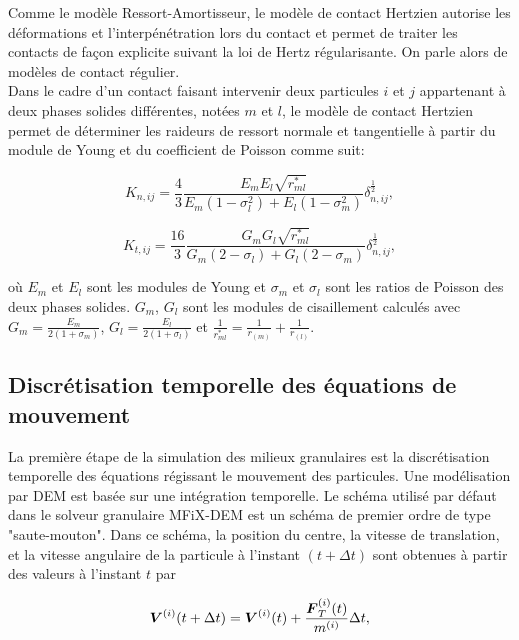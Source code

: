 Comme le modèle Ressort-Amortisseur, le modèle de contact Hertzien autorise les déformations et l'interpénétration lors du contact et permet de traiter les contacts de façon explicite suivant la loi de Hertz régularisante. On parle alors de modèles de contact régulier.\\
Dans le cadre d'un contact faisant intervenir deux particules $i$ et $j$ appartenant à deux phases solides différentes, notées $m$ et $l$, le modèle de contact Hertzien permet de déterminer les raideurs de ressort normale et tangentielle à partir du module de Young et du coefficient de Poisson comme suit:

\begin{equation} \label{eq: 20}
K_{n,ij} = \frac{4}{3} \frac{E_m E_l \sqrt{r^*_{ml}}}{E_m (1 - \sigma_l^2) + E_l (1 - \sigma_m^2)}\delta^{\frac{1}{2}}_{n,ij},
\end{equation}

\begin{equation} \label{eq: 21}
K_{t,ij} = \frac{16}{3} \frac{G_m G_l \sqrt{r^*_{ml}}}{G_m (2 - \sigma_l) + G_l (2 - \sigma_m)}\delta^{\frac{1}{2}}_{n,ij},
\end{equation}

où $E_m$ et $E_l$ sont les modules de Young et $\sigma_m$ et $\sigma_l$ sont les ratios de Poisson des deux phases solides. $G_m$, $G_l$ sont les modules de cisaillement calculés avec $G_m = \frac{E_m}{2(1 + \sigma_m)}$, $G_l = \frac{E_l}{2(1 + \sigma_l)}$ et $\frac{1}{r^*_{ml}} = \frac{1}{r_{(m)}} + \frac{1}{r_{(l)}}$.

\subsection{Discrétisation temporelle des équations de mouvement}

La première étape de la simulation des milieux granulaires est la discrétisation temporelle des équations régissant le mouvement des particules. Une modélisation par DEM est basée sur une intégration temporelle. Le schéma utilisé par défaut dans le solveur granulaire MFiX-DEM est un schéma de premier ordre de type "saute-mouton". Dans ce schéma, la position du centre, la vitesse de translation, et la vitesse angulaire de la particule à l'instant $(t + \Delta t)$ sont obtenues à partir des valeurs à l'instant $t$ par

\begin{equation} \label{eq: 22}
\boldsymbol{V}^{(i)}(t+\Delta t) = \boldsymbol{V}^{(i)}(t) + \frac{\boldsymbol{F}_T^{(i)}(t)}{m^{(i)}}\Delta t,
\end{equation}

